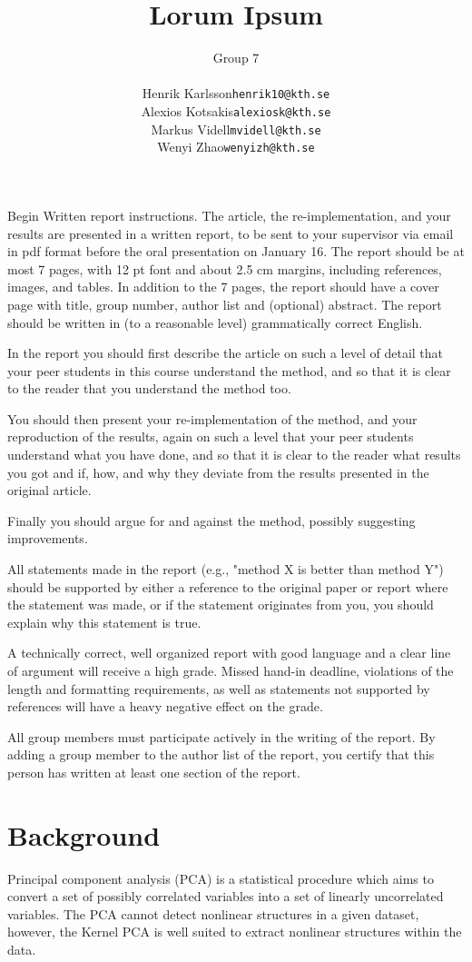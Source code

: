 \documentclass[12pt]{article}
\title{
	Lorum Ipsum
}
\author{
	Group 7\\
	\begin{tabular}{r l}
		Henrik Karlsson &\texttt{henrik10@kth.se} \\
		Alexios Kotsakis &\texttt{alexiosk@kth.se}\\
		Markus Videll &\texttt{mvidell@kth.se}\\
		Wenyi Zhao &\texttt{wenyizh@kth.se}
	\end{tabular}
}
\begin{document}
\maketitle

Begin Written report instructions.  The article, the re-implementation, and
your results are presented in a written report, to be sent to your
supervisor via email in pdf format before the oral presentation on January
16. The report should be at most 7 pages, with 12 pt font and about 2.5 cm
margins, including references, images, and tables. In addition to the 7
pages, the report should have a cover page with title, group number, author
list and (optional) abstract. The report should be written in (to a
reasonable level) grammatically correct English.

In the report you should first describe the article on such a level of
detail that your peer students in this course understand the method, and so
that it is clear to the reader that you understand the method too.

You should then present your re-implementation of the method, and your
reproduction of the results, again on such a level that your peer students
understand what you have done, and so that it is clear to the reader what
results you got and if, how, and why they deviate from the results presented
in the original article.

Finally you should argue for and against the method, possibly suggesting
improvements.

All statements made in the report (e.g., "method X is better than method Y")
should be supported by either a reference to the original paper or report
where the statement was made, or if the statement originates from you, you
should explain why this statement is true.

A technically correct, well organized report with good language and a clear
line of argument will receive a high grade. Missed hand-in deadline,
violations of the length and formatting requirements, as well as statements
not supported by references will have a heavy negative effect on the grade.

All group members must participate actively in the writing of the report. By
adding a group member to the author list of the report, you certify that
this person has written at least one section of the report.

\newpage

\section{Background}
Principal component analysis (PCA) is a statistical procedure which aims to
convert a set of possibly correlated variables into a set of linearly
uncorrelated variables. The PCA cannot detect nonlinear structures in
a given dataset, however, the Kernel PCA is well suited to extract
nonlinear structures within the data.
\end{document}
